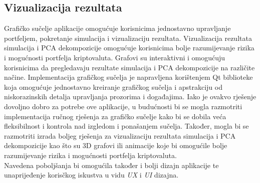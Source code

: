 \documentclass[zavrsnirad, upload]{fer}
\begin{document}
\subsection{Vizualizacija rezultata}
\label{sek:vizualizacija_rezultata_rezultati}
Grafičko sučelje aplikacije omogućuje korisnicima jednostavno
upravljanje portfeljem, pokretanje simulacija i vizualizaciju rezultata.
Vizualizacija rezultata simulacija i PCA dekompozicije
omogućuje korisnicima bolje razumijevanje rizika i mogućnosti portfelja
kriptovaluta. Grafovi su interaktivni i omogućuju korisnicima
da pregledavaju rezultate simulacija i PCA dekompozicije na različite načine.
Implementacija grafičkog sučelja je napravljena korištenjem Qt biblioteke
koja omogućuje jednostavno kreiranje grafičkog sučelja i apstrakciju
od niskorazinskih detalja upravljanja prozorima i događajima.
Iako je ovakvo rješenje dovoljno dobro za potrebe ove aplikacije,
u budućnosti bi se mogla razmotriti implementacija ručnog rješenja
za grafičko sučelje kako bi se dobila veća fleksibilnost i kontrola
nad izgledom i ponašanjem sučelja. Također, mogla bi se razmotriti
izrada boljeg rješenja za vizualizaciju rezultata simulacija i PCA dekompozicije
kao što su 3D grafovi ili animacije koje bi omogućile bolje razumijevanje
rizika i mogućnosti portfelja kriptovaluta.\\
Navedena poboljšanja bi omogućila također i bolji dizajn aplikacije
te unaprijeđenje korisčkog iskustva u vidu \textit{UX} i \textit{UI} dizajna.
\end{document}
